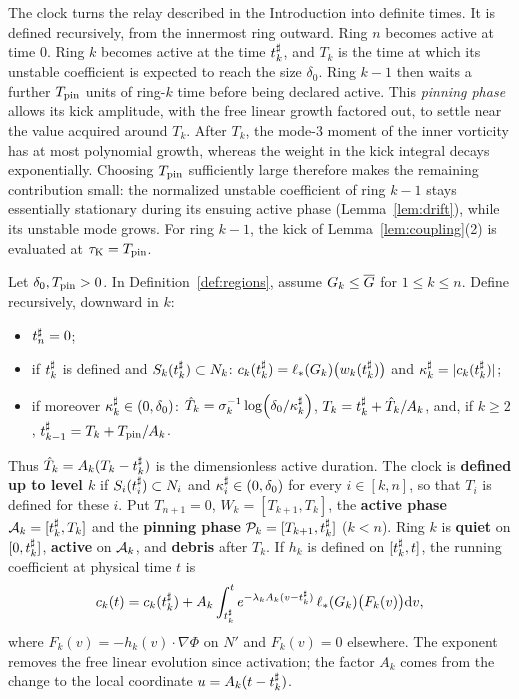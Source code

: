 The clock turns the relay described in the Introduction into definite
times. It is defined recursively, from the innermost ring outward. Ring $n$
becomes active at time $0$. Ring $k$ becomes active at the time $t^\sharp_k$, and
$T_k$ is the time at which its unstable coefficient is expected to reach the
size $\delta_0$. Ring $k-1$ then waits a further $T_{\mathrm{pin}}$ units of ring-$k$
time before being declared active. This \emph{pinning phase} allows its kick
amplitude, with the free linear growth factored out, to settle near the value
acquired around $T_k$. After $T_k$, the mode-$3$ moment of the inner vorticity
has at most polynomial growth, whereas the weight in the kick integral decays
exponentially. Choosing $T_{\mathrm{pin}}$ sufficiently large therefore makes the
remaining contribution small: the normalized unstable coefficient of ring
$k-1$ stays essentially stationary during its ensuing active phase
(Lemma~\ref{lem:drift}), while its unstable mode grows. For ring $k-1$, the kick
of Lemma~\ref{lem:coupling}\textup{(2)} is evaluated at $\tau_{\mathrm{K}}=T_{\mathrm{pin}}$.

\begin{definition}
\label{def:clock}
Let $\delta_0,T_{\mathrm{pin}}>0$. In Definition~\ref{def:regions}, assume $G_k\le\overline{G}$
for $1\le k\le n$. Define recursively, downward in $k$:
\begin{itemize}
\item $t^\sharp_n=0$;
\item if $t^\sharp_k$ is defined and $S_k(t^\sharp_k)\subset N_k$:
  $c_k(t^\sharp_k)=\ell_*(G_k)\big(w_k(t^\sharp_k)\big)$ and $\kappa^\sharp_k=|c_k(t^\sharp_k)|$;
\item if moreover $\kappa^\sharp_k\in(0,\delta_0)$:
  $\hat T_k=\sigma_k^{-1}\log(\delta_0/\kappa^\sharp_k)$, $T_k=t^\sharp_k+\hat T_k/A_k$, and, if
  $k\ge2$, $t^\sharp_{k-1}=T_k+T_{\mathrm{pin}}/A_k$.
\end{itemize}
Thus $\hat T_k=A_k(T_k-t^\sharp_k)$ is the dimensionless active duration.
The clock is \textbf{defined up to level $k$} if $S_i(t^\sharp_i)\subset N_i$ and
$\kappa^\sharp_i\in(0,\delta_0)$ for every $i\in[k,n]$, so that $T_i$ is defined for
these $i$. Put $T_{n+1}=0$, $W_k=[T_{k+1},T_k]$, the
\textbf{active phase} $\mathcal{A}_k=[t^\sharp_k,T_k]$ and the \textbf{pinning phase}
$\mathcal{P}_k=[T_{k+1},t^\sharp_k]$ ($k<n$). Ring $k$ is \textbf{quiet} on $[0,t^\sharp_k]$,
\textbf{active} on $\mathcal{A}_k$, and \textbf{debris} after $T_k$. If $h_k$ is
defined on $[t^\sharp_k,t]$, the running coefficient at physical time $t$ is
\begin{equation}
\label{eq:running-k}
c_k(t)=c_k(t^\sharp_k)+A_k\int_{t^\sharp_k}^t
 e^{-\lambda_kA_k(v-t^\sharp_k)}\,\ell_*(G_k)\big(F_k(v)\big)\dd v,
\end{equation}
where $F_k(v)=-h_k(v)\cdot\nabla\Phi$ on $N'$ and $F_k(v)=0$ elsewhere.
The exponent removes the free linear evolution since activation; the factor
$A_k$ comes from the change to the local coordinate $u=A_k(t-t^\sharp_k)$.
\end{definition}

